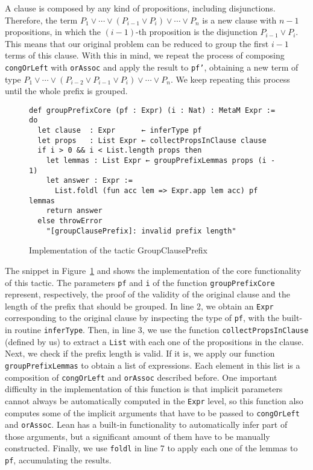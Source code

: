 A clause is composed by any kind of propositions, including disjunctions.
Therefore, the term $P_{1} \vee \cdots \vee (P_{i - 1} \vee P_{i}) \vee \cdots \vee P_{n}$ is a new clause
with $n - 1$ propositions, in which the $(i - 1)$-th proposition is the disjunction
$P_{i - 1} \vee P_{i}$. This means that our original problem can be reduced to
group the first $i - 1$ terms of this clause.
With this in mind, we repeat the process of composing \texttt{congOrLeft} with
\texttt{orAssoc} and apply the result to \texttt{pf'}, obtaining
a new term of type $P_{1} \vee \cdots \vee (P_{i - 2} \vee P_{i - 1} \vee P_{i}) \vee \cdots \vee P_{n}$.
We keep repeating this process until the whole prefix is grouped.


\begin{figure}[t]
\begin{verbatim}
def groupPrefixCore (pf : Expr) (i : Nat) : MetaM Expr := do
  let clause  : Expr      ← inferType pf
  let props   : List Expr ← collectPropsInClause clause
  if i > 0 && i < List.length props then
    let lemmas : List Expr ← groupPrefixLemmas props (i - 1)
    let answer : Expr :=
      List.foldl (fun acc lem => Expr.app lem acc) pf lemmas
    return answer
  else throwError
    "[groupClausePrefix]: invalid prefix length"
\end{verbatim}
\caption{Implementation of the tactic GroupClausePrefix}\label{groupClause}
\end{figure}

The snippet in Figure~\ref{groupClause} and shows the
implementation of the core functionality of this tactic.
The parameters \texttt{pf} and \texttt{i} of the function \texttt{groupPrefixCore}
represent, respectively, the proof of the validity of the original clause
and the length of the prefix that should be grouped. In line 2, we obtain
an \texttt{Expr} corresponding to the original clause by inspecting the type
of \texttt{pf}, with the built-in routine \texttt{inferType}. Then, in line 3,
we use the function \texttt{collectPropsInClause} (defined by us) to
extract a \texttt{List} with each one of the propositions in the clause.
Next, we check if the prefix length is valid. If it is, we apply our function
\texttt{groupPrefixLemmas} to obtain a list of expressions. Each element in this list
is a composition of \texttt{congOrLeft} and \texttt{orAssoc} described before.
One important difficulty in the implementation of this function is that implicit parameters cannot always be automatically computed in the \texttt{Expr} level, so
this function also computes some of the implicit arguments that have to be
passed to \texttt{congOrLeft} and \texttt{orAssoc}. Lean has a built-in
functionality to automatically infer part of those arguments, but a significant
amount of them have to be manually constructed.
Finally, we use \texttt{foldl}
in line 7 to apply each one of the lemmas to \texttt{pf}, accumulating the results.

